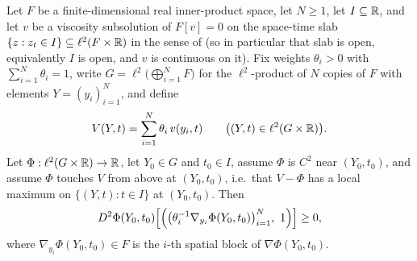 \begin{lemma}
Let $F$ be a finite-dimensional real inner-product space, let $N\ge1$, let
$I\subseteq\mathbb{R}$, and let $v$ be a viscosity subsolution of $F[v]=0$ on the
space-time slab $\{z:z_t\in I\}\subseteq\ell^2(F\times\mathbb{R})$ in the sense of
 (so in particular that slab is open, equivalently $I$ is
open, and $v$ is continuous on it). Fix weights $\theta_i>0$ with
$\sum_{i=1}^N\theta_i=1$, write
$G=\ell^2\bigl(\bigoplus_{i=1}^NF\bigr)$ for the $\ell^2$-product of $N$ copies
of $F$ with elements $Y=(y_i)_{i=1}^N$, and define
\[
  V(Y,t)=\sum_{i=1}^N\theta_i\,v(y_i,t)
  \qquad\bigl((Y,t)\in\ell^2(G\times\mathbb{R})\bigr).
\]
Let $\Phi:\ell^2(G\times\mathbb{R})\to\mathbb{R}$, let $Y_0\in G$ and $t_0\in I$, assume $\Phi$
is $C^2$ near $(Y_0,t_0)$, and assume $\Phi$ touches $V$ from above at
$(Y_0,t_0)$, i.e.\ that $V-\Phi$ has a local maximum on $\{(Y,t):t\in I\}$ at
$(Y_0,t_0)$. Then
\[
  D^2\Phi(Y_0,t_0)
   \Bigl[\Bigl(\bigl(\theta_i^{-1}\nabla_{y_i}\Phi(Y_0,t_0)\bigr)_{i=1}^N,\
     1\Bigr)\Bigr]\ge0,
\]
where $\nabla_{y_i}\Phi(Y_0,t_0)\in F$ is the $i$-th spatial block of
$\nabla\Phi(Y_0,t_0)$.
\end{lemma}
